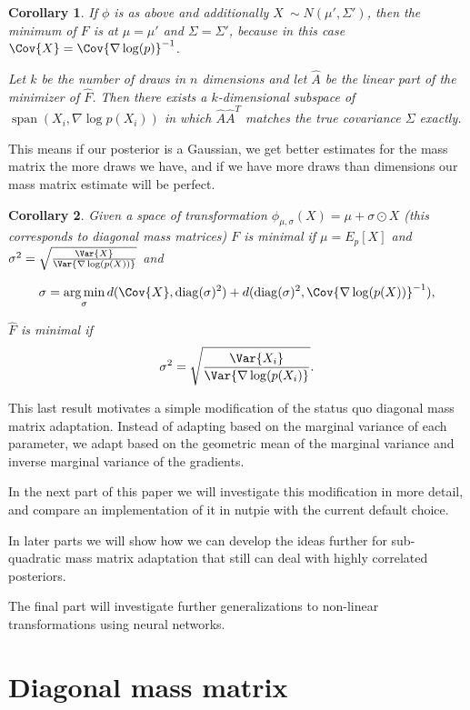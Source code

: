 \documentclass{scrartcl}
\DeclareMathOperator{\diag}{diag}
\DeclareMathOperator*{\argmin}{arg\,min}
\DeclareMathOperator{\vecSpan}{span}
\newtheorem{cor}{Corollary}
\begin{document}
\begin{cor}
If $\phi$ is as above and additionally $X ~ \sim N(\mu', \Sigma')$,
then the minimum of $F$ is at $\mu = \mu'$ and $\Sigma = \Sigma'$, because in
this case $\Cov{X} = \Cov{\nabla \log(p)}^{-1}$.

Let $k$ be the number of draws in $n$ dimensions and let $\hat A$ be the linear
part of the minimizer of $\hat F$. Then there exists a $k$-dimensional
subspace of $\vecSpan(X_i, \nabla\log p(X_i))$ in which $\hat A\hat A^T$
matches the true covariance $\Sigma$ exactly.
\end{cor}

This means if our posterior is a Gaussian, we get better estimates for the mass
matrix the more draws we have, and if we have more draws than dimensions our
mass matrix estimate will be perfect.

\begin{cor}
Given a space of transformation $\phi_{\mu, \sigma}(X) = \mu + \sigma \odot X$
(this corresponds to diagonal mass matrices) $F$ is minimal if $\mu =
E_p[X]$ and $\sigma^2 = \sqrt{\frac{\Var{X}}{\Var{\nabla \log(p(X))}}}$
and

\[
\sigma
  = \argmin_{\sigma} d(\Cov{X}, \diag(\sigma)^2)
    + d(\diag(\sigma)^2, \Cov{\nabla\log(p(X))}^{-1}),
\]

$\hat F$ is minimal if
\[
\sigma^2 = \sqrt{\frac{\Var{X_i}}{\Var{\nabla \log(p(X_i)}}}.
\]
\end{cor}

This last result motivates a simple modification of the status quo diagonal
mass matrix adaptation. Instead of adapting based on the marginal variance of
each parameter, we adapt based on the geometric mean of the marginal variance
and inverse marginal variance of the gradients.

In the next part of this paper we will investigate this modification in more
detail, and compare an implementation of it in nutpie with the current default
choice.

In later parts we will show how we can develop the ideas further for
sub-quadratic mass matrix adaptation that still can deal with highly correlated
posteriors.

The final part will investigate further generalizations to non-linear
transformations using neural networks.

\section{Diagonal mass matrix}
\end{document}
